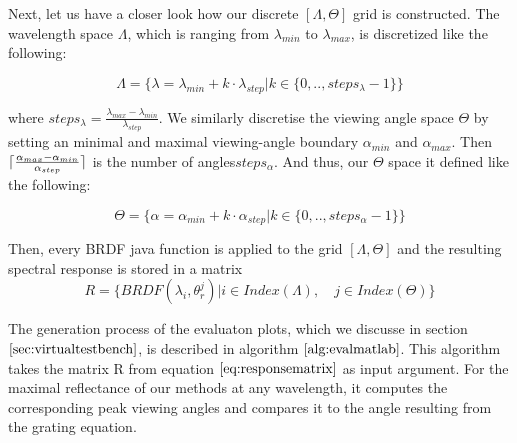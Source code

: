 Next, let us have a closer look how our discrete $[\Lambda, \Theta]$ grid is constructed. The wavelength space $\Lambda$, which is ranging from $\lambda_{min}$ to $\lambda_{max}$, is discretized like the following:

\begin{equation}
\Lambda = \{\lambda = \lambda_{min} + k \cdot \lambda_{step} | k \in \{0,..,steps_{\lambda}-1\}\}
\label{eq:lambdaspacesetup}
\end{equation}

where $steps_{\lambda} = \frac{\lambda_{max}-\lambda_{min}}{\lambda_{step}}$.  We similarly discretise the viewing angle space $\Theta$ by setting an minimal and maximal viewing-angle boundary $\alpha_{min}$ and $\alpha_{max}$. Then $\lceil\frac{\alpha_{max} - \alpha_{min}}{\alpha_{step}}\rceil$ is the number of angles$ steps_{\alpha}$. And thus, our $\Theta$ space it defined like the following:

\begin{equation}
\Theta = \{\alpha = \alpha_{min} + k \cdot \alpha_{step} | k \in \{0,..,steps_{\alpha}-1\}\}
\label{eq:thetaspacesetup}
\end{equation}

Then, every BRDF java function is applied to the grid $[\Lambda, \Theta]$ and the resulting spectral response is stored in a matrix
\begin{equation} 
R = \{BRDF(\lambda_i, \theta_{r}^{j}) | i \in Index(\Lambda), \quad j \in Index(\Theta)\}
\label{eq:responsematrix}
\end{equation}

The generation process of the evaluaton plots, which we discusse in section $\ref{sec:virtualtestbench}$, is described in algorithm $\ref{alg:evalmatlab}$. This algorithm takes the matrix R from equation $\ref{eq:responsematrix}$ as input argument. For the maximal reflectance of our methods at any wavelength, it computes the corresponding peak viewing angles and compares it to the angle resulting from the grating equation.

